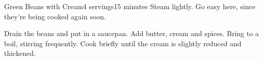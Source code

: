 \documentclass[../Cookbook.tex]{subfiles}
\begin{document}
\begin{recipe}[CreamBeans]{Green Beans with Cream}{4 servings}{15 minutes}
Steam lightly. Go easy here, since they're being cooked again soon.

Drain the beans and put in a saucepan.
Add butter, cream and spices.
Bring to a boil, stirring frequently.
Cook briefly until the cream is slightly reduced and thickened.
\end{recipe}
\end{document}
